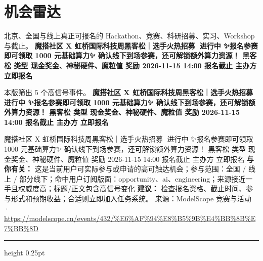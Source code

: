 \documentclass[10.5pt]{ctexart}
\begin{document}
\section*{机会雷达}
{\color{ormuted} 北京、全国与线上真正可报名的 Hackathon、竞赛、科研招募、实习、Workshop 与截止。}
\vspace{2mm}
{\LARGE\bfseries 魔搭社区 X 虹桥国际科技周黑客松｜选手火热招募🚀 进行中 ✨报名参赛即可领取 1000 元基础算力✨ 确认线下到场参赛，还可解锁额外算力资源！ 黑客松 类型 现金奖金、神秘硬件、魔粒值 奖励 2026-11-15 14:00 报名截止 主办方 立即报名}\par
\vspace{1mm}
{\color{ormuted} 本版筛出 5 个高信号事件。}
\vspace{3mm}
{\Large\bfseries 魔搭社区 X 虹桥国际科技周黑客松｜选手火热招募🚀 进行中 ✨报名参赛即可领取 1000 元基础算力✨ 确认线下到场参赛，还可解锁额外算力资源！ 黑客松 类型 现金奖金、神秘硬件、魔粒值 奖励 2026-11-15 14:00 报名截止 主办方 立即报名}\par
魔搭社区 X 虹桥国际科技周黑客松｜选手火热招募🚀 进行中 ✨报名参赛即可领取 1000 元基础算力✨ 确认线下到场参赛，还可解锁额外算力资源！ 黑客松 类型 现金奖金、神秘硬件、魔粒值 奖励 2026-11-15 14:00 报名截止 主办方 立即报名
\textbf{与你有关：} 这是当前用户可实际参与或申请的高可触达机会；参与范围：全国 / 线上 / 部分线下；命中用户订阅版面：opportunity、ai、engineering；来源接近一手且权威度高；标题/正文包含高信号变化
\textbf{建议：} 检查报名资格、截止时间、参与形式和预期收益；合适则立即加入任务系统。
{\footnotesize\color{ormuted} 来源：ModelScope 竞赛与活动 · \url{https://modelscope.cn/events/432/%E6%AF%94%E8%B5%9B%E4%BB%8B%E7%BB%8D}}
\vspace{4mm}
\hrule height 0.25pt
\vspace{3mm}
\end{document}
